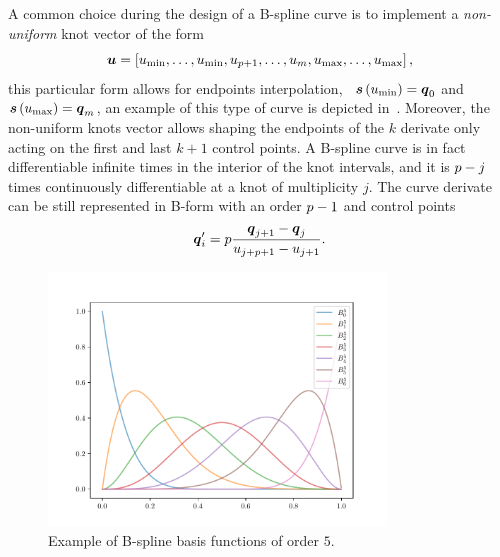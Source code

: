 A common choice during the design of a B-spline curve is to implement a \emph{non-uniform} knot vector of the form
\begin{equation*}
    \boldsymbol{u} = \left[ u_{\text{min}}, \dots, u_{\text{min}}, u_{p+1}, \dots, u_{m},
    u_{\text{max}}, \dots, u_{\text{max}} \right],
\end{equation*}
this particular form allows for endpoints interpolation, \ie~$\boldsymbol{s} \left( u_{\text{min}} \right) = \boldsymbol{q}_0$ and
$\boldsymbol{s} \left( u_{\text{max}} \right) = \boldsymbol{q}_{m}$, an example of this type of curve is depicted
in~. Moreover, the non-uniform knots vector allows shaping the endpoints of the $k$ derivate only
acting on the first and last $k+1$ control points. A B-spline curve is in fact differentiable infinite times in the interior
of the knot intervals, and it is $p-j$ times continuously differentiable at a knot of multiplicity $j$.
The curve derivate can be still represented in B-form with an order $p-1$ and control points
\begin{equation*}
    \boldsymbol{q}_i' = p \frac{\boldsymbol{q}_{j+1} - \boldsymbol{q}_{j}}{u_{j+p+1} - u_{j+1}}.
\end{equation*}
\begin{figure}[t]
	\centering
	\includegraphics[width=0.8\textwidth]{Figs/AppendixA/bspline_basis.pdf}
	\caption{Example of B-spline basis functions of order $5$.}%
    \label{FIG:BSPLINE-BASIS}
\end{figure}
